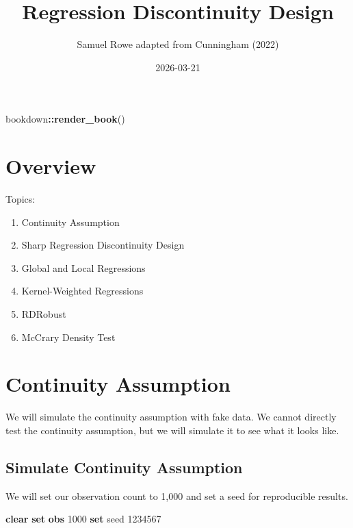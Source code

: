 \documentclass[
]{book}
\title{Regression Discontinuity Design}
\author{Samuel Rowe adapted from Cunningham (2022)}
\date{2026-03-21}
\newenvironment{Shaded}{\begin{snugshade}}{\end{snugshade}}
\newcommand{\DecValTok}[1]{\textcolor[rgb]{0.00,0.00,0.81}{#1}}
\newcommand{\FunctionTok}[1]{\textcolor[rgb]{0.13,0.29,0.53}{\textbf{#1}}}
\newcommand{\KeywordTok}[1]{\textcolor[rgb]{0.13,0.29,0.53}{\textbf{#1}}}
\newcommand{\NormalTok}[1]{#1}
\newcommand{\SpecialCharTok}[1]{\textcolor[rgb]{0.81,0.36,0.00}{\textbf{#1}}}
\providecommand{\tightlist}{%
  \setlength{\itemsep}{0pt}\setlength{\parskip}{0pt}}
\begin{document}
\maketitle

{
\setcounter{tocdepth}{1}
\tableofcontents
}
\begin{Shaded}
\begin{Highlighting}[]
\NormalTok{bookdown}\SpecialCharTok{::}\FunctionTok{render\_book}\NormalTok{()}
\end{Highlighting}
\end{Shaded}

\chapter*{Overview}\label{overview}

Topics:

\begin{enumerate}
\def\labelenumi{\arabic{enumi}.}
\tightlist
\item
  Continuity Assumption
\item
  Sharp Regression Discontinuity Design
\item
  Global and Local Regressions
\item
  Kernel-Weighted Regressions
\item
  RDRobust
\item
  McCrary Density Test
\end{enumerate}

\chapter{Continuity Assumption}\label{continuity-assumption}

We will simulate the continuity assumption with fake data. We cannot directly test the continuity assumption, but we will simulate it to see what it looks like.

\section{Simulate Continuity Assumption}\label{simulate-continuity-assumption}

We will set our observation count to 1,000 and set a seed for reproducible results.

\begin{Shaded}
\begin{Highlighting}[]
\KeywordTok{clear}
\KeywordTok{set} \KeywordTok{obs}\NormalTok{ 1000}
\KeywordTok{set} \DecValTok{seed}\NormalTok{ 1234567}
\end{Highlighting}
\end{Shaded}
\end{document}
